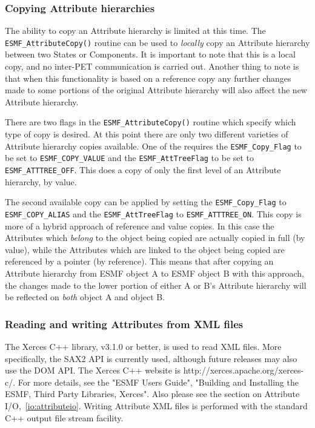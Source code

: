 \subsubsection{Copying Attribute hierarchies}
\label{sec:Att:Copy}

The ability to copy an Attribute hierarchy is limited at this time.  The {\tt ESMF\_AttributeCopy()} routine can be used to {\it locally} copy an Attribute hierarchy between two States or Components.  It is important to note that this is a local copy, and no inter-PET communication is carried out.  Another thing to note is that when this functionality is based on a reference copy any further changes made to some portions of the original Attribute hierarchy will also affect the new Attribute hierarchy.

\begin{sloppypar}
There are two flags in the {\tt ESMF\_AttributeCopy()} routine which specify which type of copy is desired.  At this point there are only two different varieties of Attribute hierarchy copies available.  One of the requires the {\tt ESMF\_Copy\_Flag} to be set to {\tt ESMF\_COPY\_VALUE} and the {\tt ESMF\_AttTreeFlag} to be set to {\tt ESMF\_ATTTREE\_OFF}.  This does a copy of only the first level of an Attribute hierarchy, by value.
\end{sloppypar}

The second available copy can be applied by setting the {\tt ESMF\_Copy\_Flag} to {\tt ESMF\_COPY\_ALIAS} and the {\tt ESMF\_AttTreeFlag} to {\tt ESMF\_ATTTREE\_ON}.  This copy is more of a hybrid approach of reference and value copies.  In this case the Attributes which {\it belong} to the object being copied are actually copied in full (by value), while the Attributes which are linked to the object being copied are referenced by a pointer (by reference).  This means that after copying an Attribute hierarchy from ESMF object A to ESMF object B with this approach, the changes made to the lower portion of either A or B's Attribute hierarchy will be reflected on {\it both} object A and object B.

\subsubsection{Reading and writing Attributes from XML files}
\label{Att:Xerces}

\begin{sloppypar}
The Xerces C++ library, v3.1.0 or better, is used to read XML files.  
More specifically, the SAX2 API is currently used, although future releases may 
also use the DOM API.  The Xerces C++ website is 
http://xerces.apache.org/xerces-c/.  For more details, see the 
"ESMF Users Guide", "Building and Installing the ESMF, Third Party Libraries,
Xerces".  Also please see the section on Attribute I/O,~\ref{io:attributeio}.  
Writing Attribute XML files is performed with the standard C++ output file 
stream facility.
\end{sloppypar}


